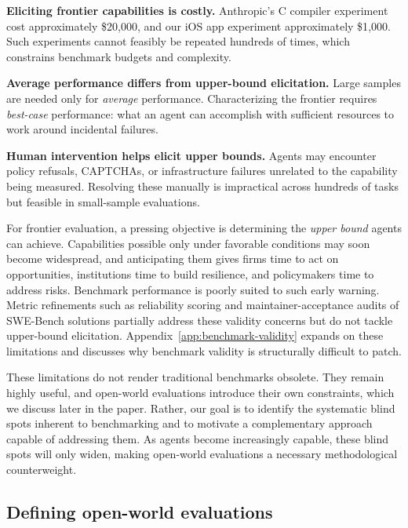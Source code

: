 \documentclass{article}
\begin{document}
\begin{underestbox}
\textbf{Eliciting frontier capabilities is costly.} Anthropic's C compiler experiment cost approximately \$20{,}000, and our iOS app experiment approximately \$1{,}000. Such experiments cannot feasibly be repeated hundreds of times, which constrains benchmark budgets and complexity.

\smallskip
\textbf{Average performance differs from upper-bound elicitation.} Large samples are needed only for \emph{average} performance. Characterizing the frontier requires \emph{best-case} performance: what an agent can accomplish with sufficient resources to work around incidental failures.

\smallskip
\textbf{Human intervention helps elicit upper bounds.} Agents may encounter policy refusals, CAPTCHAs, or infrastructure failures unrelated to the capability being measured. Resolving these manually is impractical across hundreds of tasks but feasible in small-sample evaluations.
\end{underestbox}

For frontier evaluation, a pressing objective is determining the \emph{upper bound} agents can achieve. Capabilities possible only under favorable conditions may soon become widespread, and anticipating them gives firms time to act on opportunities, institutions time to build resilience, and policymakers time to address risks. Benchmark performance is poorly suited to such early warning. Metric refinements such as reliability scoring \citep{arxivabs260216666} and maintainer-acceptance audits of SWE-Bench solutions \citep{metrOrgNotes2026} partially address these validity concerns but do not tackle upper-bound elicitation. Appendix~\ref{app:benchmark-validity} expands on these limitations and discusses why benchmark validity is structurally difficult to patch.

These limitations do not render traditional benchmarks obsolete. They remain highly useful, and open-world evaluations introduce their own constraints, which we discuss later in the paper. Rather, our goal is to identify the systematic blind spots inherent to benchmarking and to motivate a complementary approach capable of addressing them. As agents become increasingly capable, these blind spots will only widen, making open-world evaluations a necessary methodological counterweight.

\subsection{Defining open-world evaluations}\label{what-are-open-world-evaluations}
\end{document}
